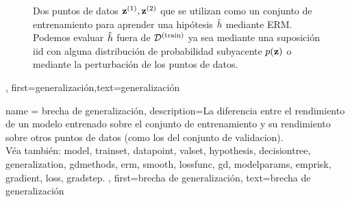 {{\begin{figure}[H]
		                   	\caption{Dos puntos de datos ${\bf z}^{(1)},{\bf z}^{(2)}$ que se utilizan como un conjunto de entrenamiento
							   	para aprender una hipótesis $\hat{h}$ mediante ERM. Podemos evaluar $\hat{h}$ 
		                   		fuera de $\mathcal{D}^{(\rm train)}$ ya sea mediante una suposición iid con alguna distribución de probabilidad subyacente $p({\bf z})$ 
		                   		o mediante la perturbación de los puntos de datos.}
		                   	\label{fig:polynomial_fit_dict}
		                   \end{figure}
		                   \newpage
		},
	first={generalización},text={generalización} }

{name = {brecha de generalización}, 
	description={La diferencia entre el rendimiento de un modelo
		entrenado sobre el conjunto de entrenamiento y su rendimiento sobre otros puntos de datos
		(como los del conjunto de validacion).\\
		Véa también: \gls{model}, \gls{trainset}, \gls{datapoint}, \gls{valset}, \gls{hypothesis}, 
		\gls{decisiontree}, \gls{generalization}, \gls{gdmethods}, \gls{erm}, \gls{smooth}, 
		\gls{lossfunc}, \gls{gd}, \glspl{modelparam}, \gls{emprisk}, \gls{gradient}, \gls{loss}, 
		\gls{gradstep}.
	}, 
	first={brecha de generalización}, 
	text={brecha de generalización}
}


